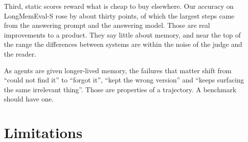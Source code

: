 \documentclass[11pt]{article}
\begin{document}
Third, static scores reward what is cheap to buy elsewhere. Our
accuracy on LongMemEval-S rose by about thirty points, of which the
largest steps came from the answering prompt and the answering model.
Those are real improvements to a product. They say little about
memory, and near the top of the range the differences between systems
are within the noise of the judge and the reader.

As agents are given longer-lived memory, the failures that matter
shift from ``could not find it'' to ``forgot it'', ``kept the wrong
version'' and ``keeps surfacing the same irrelevant thing''. Those are
properties of a trajectory. A benchmark should have one.

\section{Limitations}
\end{document}
